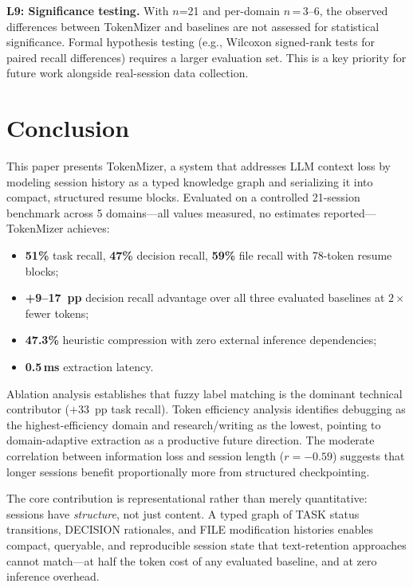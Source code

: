 \documentclass[journal]{IEEEtran}
\begin{document}
\textbf{L9: Significance testing.}
With $n$=21 and per-domain $n$\,=\,3--6, the observed
differences between TokenMizer and baselines are not
assessed for statistical significance.
Formal hypothesis testing (e.g., Wilcoxon signed-rank tests
for paired recall differences) requires a larger evaluation
set. This is a key priority for future work alongside
real-session data collection.

\section{Conclusion}
\label{sec:conclusion}

This paper presents TokenMizer, a system that addresses LLM
context loss by modeling session history as a typed
knowledge graph and serializing it into compact, structured
resume blocks.
Evaluated on a controlled 21-session benchmark across 5
domains---all values measured, no estimates reported---
TokenMizer achieves:
\begin{itemize}
  \item \textbf{51\%} task recall, \textbf{47\%} decision
    recall, \textbf{59\%} file recall with 78-token resume
    blocks;
  \item \textbf{+9--17~pp} decision recall advantage over
    all three evaluated baselines at $2\times$ fewer tokens;
  \item \textbf{47.3\%} heuristic compression with zero
    external inference dependencies;
  \item \textbf{0.5\,ms} extraction latency.
\end{itemize}

Ablation analysis establishes that fuzzy label matching
is the dominant technical contributor ($+33$~pp task recall).
Token efficiency analysis identifies debugging as the
highest-efficiency domain and research/writing as the lowest,
pointing to domain-adaptive extraction as a productive
future direction.
The moderate correlation between information loss and session
length ($r = -0.59$) suggests that longer sessions benefit
proportionally more from structured checkpointing.

The core contribution is representational rather than
merely quantitative: sessions have \emph{structure}, not
just content.
A typed graph of TASK status transitions, DECISION
rationales, and FILE modification histories enables compact,
queryable, and reproducible session state that text-retention
approaches cannot match---at half the token cost of any
evaluated baseline, and at zero inference overhead.
\end{document}
